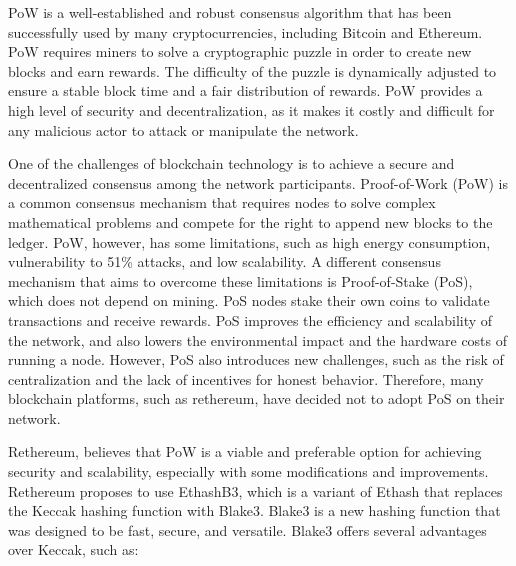 \documentclass[a4paper,onecolumn, superscriptaddress,10pt,accepted=2020-05-01,issue=1, volume=2, shorttitle=papers]{compositionalityarticle}
\begin{document}
\newpage

PoW is a well-established and robust consensus algorithm that has been successfully used by many cryptocurrencies, including Bitcoin and Ethereum. PoW requires miners to solve a cryptographic puzzle in order to create new blocks and earn rewards. The difficulty of the puzzle is dynamically adjusted to ensure a stable block time and a fair distribution of rewards. PoW provides a high level of security and decentralization, as it makes it costly and difficult for any malicious actor to attack or manipulate the network.

\vspace{0.3cm}

One of the challenges of blockchain technology is to achieve a secure and decentralized consensus among the network participants. Proof-of-Work (PoW) is a common consensus mechanism that requires nodes to solve complex mathematical problems and compete for the right to append new blocks to the ledger. PoW, however, has some limitations, such as high energy consumption, vulnerability to 51\% attacks, and low scalability. A different consensus mechanism that aims to overcome these limitations is Proof-of-Stake (PoS), which does not depend on mining. PoS nodes stake their own coins to validate transactions and receive rewards. PoS improves the efficiency and scalability of the network, and also lowers the environmental impact and the hardware costs of running a node. However, PoS also introduces new challenges, such as the risk of centralization and the lack of incentives for honest behavior. Therefore, many blockchain platforms, such as rethereum, have decided not to adopt PoS on their network.

\vspace{0.3cm}

Rethereum, believes that PoW is a viable and preferable option for achieving security and scalability, especially with some modifications and improvements. Rethereum proposes to use EthashB3, which is a variant of Ethash that replaces the Keccak hashing function with Blake3. Blake3 is a new hashing function that was designed to be fast, secure, and versatile. Blake3 offers several advantages over Keccak, such as:

\vspace{0.3cm}
\end{document}
